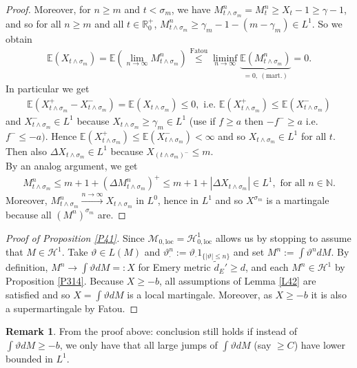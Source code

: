 \documentclass[12pt,a4paper, twoside]{article}
\theoremstyle{definition}
\newtheorem{rem}{Remark}[section]
\newcommand{\EE}{\mathbb{E}} %
\begin{document}
\begin{proof}
Moreover, for $n \geq m$ and $t < \sigma_m$, we have $M_{t \wedge \sigma_m}^n = M_t^n \geq X_t-1 \geq \gamma-1$, and so for all $n \geq m$ and all $t \in \mathbb{R}_0^+$, $M_{t \wedge \sigma_m}^n \geq \gamma_m-1-(m-\gamma_m) \in L^1$. So we obtain 
\begin{align*}
\EE( X_{t \wedge \sigma_m}) = \EE( \lim_{n \to \infty} M_{t \wedge \sigma_m}^n) \overset{\text{Fatou}} \leq \liminf_{n \to \infty} \underbrace{\EE( M_{t \wedge \sigma_m}^n)}_{=0,\ (\text{mart.})}=0.
\end{align*}
In particular we get
\begin{align*}
\EE(X_{t \wedge \sigma_m}^+ - X_{t \wedge \sigma_m}^-) = \EE(X_{t \wedge \sigma_m}) \leq 0, \text{ i.e. } \EE( X_{t \wedge \sigma_m}^+) \leq \EE( X_{t \wedge \sigma_m}^-)
\end{align*}
and $X_{t \wedge \sigma_m}^- \in L^1$ because $X_{t \wedge \sigma_m} \geq \gamma_m \in L^1$ (use if $f \geq a$ then $-f^{-} \geq a$ i.e. $f^{-} \leq -a)$. Hence $\EE( X_{t \wedge \sigma_m}^+) \leq \EE( X_{t \wedge \sigma_m}^-) < \infty$ and so $X_{t \wedge \sigma_m} \in L^1$ for all $t$. Then also $\Delta X_{t \wedge \sigma_m} \in L^1$ because $X_{( t \wedge \sigma_m)^-} \leq m$.  \\
By an analog argument, we get 
\begin{align*}
M_{t \wedge \sigma_m}^n \leq m+1 + ( \Delta M_{t \wedge \sigma_m}^n)^+ \leq m+1 + | \Delta X_{t \wedge \sigma_m}| \in L^1, \text{ for all } n \in \mathbb{N}.
\end{align*}
Moreover, $M_{t \wedge \sigma_m}^n \xrightarrow{n \to \infty} X_{t \wedge \sigma_m}$ in $L^0$, hence in $L^1$ and so $X^{\sigma_m}$ is a martingale because all $(M^n)^{\sigma_m}$ are. 
\end{proof}
\newpage
\begin{proof}[Proof of Proposition \ref{P41}] Since $\mathcal{M}_{0, \text{loc}} = \mathcal{H}_{0, \text{loc}}^1$ allows us by stopping to assume that $M \in \mathcal{H}^1$. Take $\vartheta \in L(M)$ and $\vartheta_\cdot^n := \vartheta_\cdot 1_{\{ | \vartheta | \leq n \}}$ and set $M^n:= \int \vartheta^n d M$. By definition, $M^n \to \int \vartheta dM =: X$ for Emery metric $\widetilde{d}_E' \geq d$, and each $M^n \in \mathcal{H}^1$ by Proposition \ref{P314}. Because $X \geq -b$, all assumptions of Lemma \ref{L42} are satisfied and so $X= \int \vartheta dM$ is a local martingale. Moreover, as $X \geq -b$ it is also a supermartingale by Fatou. 
\end{proof}
\begin{rem} From the proof above: conclusion still holds if instead of $\int \vartheta dM \geq -b$, we only have that all large jumps of $\int \vartheta dM$ (say $\geq C$) have lower bounded in $L^1$. 
\end{rem}
\end{document}
